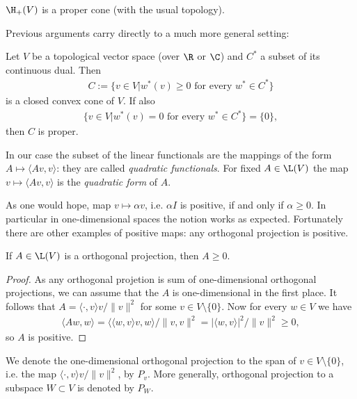 \begin{lause}\label{basic_positive}
	$\H_{+}(V)$ is a proper cone (with the usual topology).
\end{lause}

Previous arguments carry directly to a much more general setting:

\begin{lause}\label{positive_machine}
	Let $V$ be a topological vector space (over $\R$ or $\C$) and $C^{*}$ a subset of its continuous dual. Then
	\begin{align*}
		C := \{v \in V | w^{*}(v) \geq 0 \text{ for every $w^{*} \in C^{*}$}\}
	\end{align*}
	is a closed convex cone of $V$. If also
	\begin{align*}
		\{v \in V | w^{*}(v) = 0 \text{ for every $w^{*} \in C^{*}$} \} = \{0\},
	\end{align*}
	then $C$ is proper.
\end{lause}

In our case the subset of the linear functionals are the mappings of the form $A \mapsto \langle A v, v \rangle$: they are called \textit{quadratic functionals}. For fixed $A \in \L(V)$ the map $v \mapsto \langle A v, v \rangle$ is the \textit{quadratic form} of $A$.

As one would hope, map $v \mapsto \alpha v$, i.e. $\alpha I$ is positive, if and only if $\alpha \geq 0$. In particular in one-dimensional spaces the notion works as expected. Fortunately there are other examples of positive maps: any orthogonal projection is positive.

\begin{prop}
	If $A \in \L(V)$ is a orthogonal projection, then $A \geq 0$.
\end{prop}
\begin{proof}
	As any orthogonal projetion is sum of one-dimensional orthogonal projections, we can assume that the $A$ is one-dimensional in the first place. It follows that $A = \langle \cdot, v \rangle v/\|v\|^2$ for some $v \in V \setminus \{0\}$. Now for every $w \in V$ we have
	\begin{align*}
		\langle A w, w \rangle = \langle \langle w, v \rangle v, w \rangle/\|v, v\|^{2} = |\langle w, v \rangle|^{2}/\|v\|^{2} \geq 0,
	\end{align*}
	so $A$ is positive.
\end{proof}

We denote the one-dimensional orthogonal projection to the span of $v \in V \setminus \{0\}$, i.e. the map $ \langle \cdot, v \rangle v/\|v\|^2$, by $P_{v}$. More generally, orthogonal projection to a subspace $W \subset V$ is denoted by $P_{W}$.

